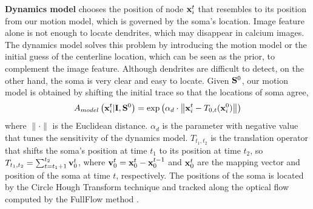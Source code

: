 \documentclass{article}
\begin{document}
{\bf Dynamics model} chooses the position of node ${\bf x}_i^t$ that resembles to its position from our motion model, which is governed by the soma's location. Image feature alone is not enough to locate dendrites, which may disappear in calcium images. The dynamics model solves this problem by introducing the motion model or the initial guess of the centerline location, which can be seen as the prior, to complement the image feature. Although dendrites are difficult to detect, on the other hand, the soma is very clear and easy to locate. Given ${\bf S}^0$, our motion model is obtained by shifting the initial trace so that the locations of soma agree,
\begin{equation} \label{eq:dynamic}
A_{model}\left({\bf x}_i^t | {\bf I}, {\bf S}^0\right) = \exp \left( \alpha_d \cdot \left\| {\bf x}_i^t - T_{0,t}({\bf x}_i^0) \right\| \right)
\end{equation}
where $\|\cdot\|$ is the Euclidean distance. $\alpha_d$ is the parameter with negative value that tunes the sensitivity of the dynamics model. $T_{t_1,t_2}$ is the translation operator that shifts the soma's position at time $t_1$ to its position at time $t_2$, so $T_{t_1,t_2} = \sum_{t=t_1+1}^{t_2} {\bf v}_0^t$, where ${\bf v}_0^t = {\bf x}_0^t - {\bf x}_0^{t-1}$ and ${\bf x}_0^t$ are the mapping vector and position of the soma at time $t$, respectively. The positions of the soma is located by the Circle Hough Transform technique \cite{Duda1972, Atherton1999} and tracked along the optical flow computed by the FullFlow method \cite{Chen2016}.
\end{document}

